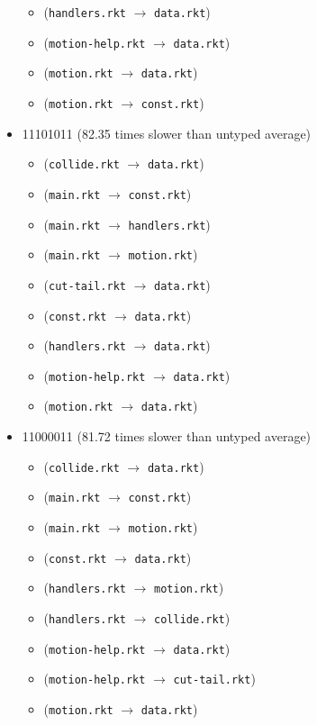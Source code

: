 \documentclass{article}
\newcommand{\mono}[1]{\texttt{#1}}
\begin{document}
\begin{itemize}
\begin{itemize}
  \item (\mono{handlers.rkt} $\rightarrow$ \mono{data.rkt})
  \item (\mono{motion-help.rkt} $\rightarrow$ \mono{data.rkt})
  \item (\mono{motion.rkt} $\rightarrow$ \mono{data.rkt})
  \item (\mono{motion.rkt} $\rightarrow$ \mono{const.rkt})
  \end{itemize}
\item 11101011 (82.35 times slower than untyped average)
  \begin{itemize}
  \item (\mono{collide.rkt} $\rightarrow$ \mono{data.rkt})
  \item (\mono{main.rkt} $\rightarrow$ \mono{const.rkt})
  \item (\mono{main.rkt} $\rightarrow$ \mono{handlers.rkt})
  \item (\mono{main.rkt} $\rightarrow$ \mono{motion.rkt})
  \item (\mono{cut-tail.rkt} $\rightarrow$ \mono{data.rkt})
  \item (\mono{const.rkt} $\rightarrow$ \mono{data.rkt})
  \item (\mono{handlers.rkt} $\rightarrow$ \mono{data.rkt})
  \item (\mono{motion-help.rkt} $\rightarrow$ \mono{data.rkt})
  \item (\mono{motion.rkt} $\rightarrow$ \mono{data.rkt})
  \end{itemize}
\item 11000011 (81.72 times slower than untyped average)
  \begin{itemize}
  \item (\mono{collide.rkt} $\rightarrow$ \mono{data.rkt})
  \item (\mono{main.rkt} $\rightarrow$ \mono{const.rkt})
  \item (\mono{main.rkt} $\rightarrow$ \mono{motion.rkt})
  \item (\mono{const.rkt} $\rightarrow$ \mono{data.rkt})
  \item (\mono{handlers.rkt} $\rightarrow$ \mono{motion.rkt})
  \item (\mono{handlers.rkt} $\rightarrow$ \mono{collide.rkt})
  \item (\mono{motion-help.rkt} $\rightarrow$ \mono{data.rkt})
  \item (\mono{motion-help.rkt} $\rightarrow$ \mono{cut-tail.rkt})
  \item (\mono{motion.rkt} $\rightarrow$ \mono{data.rkt})

\end{itemize}
\end{itemize}
\end{document}
